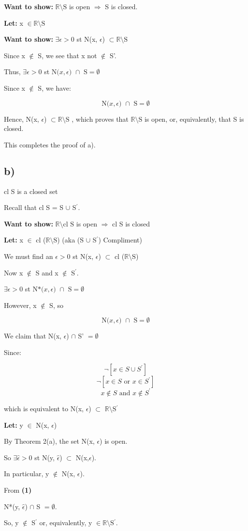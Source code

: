 \documentclass{article}
\newcommand\ssc[2][\DefaultOpt]{%
  \def\DefaultOpt{#2}%
  \subsection[#1]{#2}%
}
\newcommand{\lt}[1]{\textbf{Let: } #1}
\newcommand{\wts}[1]{\textbf{Want to show: } #1}
\newcommand{\bpth}[1]{\textbf{(#1)}}
\newcommand{\step}[2]{\begin{equation}\tag{#2}#1\end{equation}}
\newcommand{\br}{\mathbb{R}}       %
\newcommand{\ep}{\epsilon}         %
\newcommand{\sbs}{\subset}         %
\newcommand{\rar}{\Rightarrow}     %
\newcommand{\pr}{^\prime} 		   %
\newcommand{\butnot}[2]{#1\setminus{\textrm{#2}}}
\newcommand{\nbhe}[3]{\textrm{N(}#1, #2\textrm{) }\cap \textrm{ #3} = \emptyset}
\newcommand{\dnbhe}[3]{\textrm{N*(}#1, #2\textrm{) }\cap \textrm{ #3} = \emptyset}
\begin{document}
\wts{$\butnot{\br}{S}$ is open $\rar$ S is closed.} \

\lt{x $\in \butnot{\br}{S}$}


\wts{$\exists \ep > 0$ st N(x, $\ep$) $\sbs \butnot{\br}{S}$}

Since x $\not\in$ S, we see that x not $\not\in$ S'.

Thus, $\exists \ep > 0$ st $\nbhe{x}{\epsilon}{S}$ \

Since x $\not\in$ S, we have:

\step{\nbhe{x}{\epsilon}{S}}{1}

Hence, N(x, $\ep$) $\sbs \butnot{\br}{S}$ , which proves that $\butnot{\br}{S}$ is open, or, equivalently, that S is closed. \

This completes the proof of a).

\ssc{b)}
cl S is a closed set \

Recall that cl S = S $\cup$ S$\pr$.

\wts{$\butnot{\br}{cl S}$ is open $\rar$ cl S is closed}

\lt{x $\in$ cl ($\butnot{\br}{S}$) (aka (S $\cup$ S$\pr$) Compliment)} \

We must find an $\ep > 0$ st N(x, $\ep$) $\subset$ cl ($\butnot{\br}{S}$) \

Now x $\not\in$ S and x $\not\in$ S$\pr$. \

$\exists \ep > 0$ st $\dnbhe{x}{\epsilon}{S}$ \

However, x $\not\in$ S, so \

\step{\nbhe{x}{\epsilon}{S}}{1}

We claim that N(x, $\ep$) $\cap$ S' $= \emptyset$ \

Since:

\[\neg [x \in S \cup S\pr]\]
\[\neg [x \in S \textrm{ or }x \in S\pr]\]
\[x \not\in S \textrm{ and }x \not\in S\pr\]

which is equivalent to N(x, $\ep$) $\sbs$ $\butnot{\br}{S$\pr$}$ \

\lt{y $\in$ N(x, $\ep$)}

By Theorem 2(a), the set N(x, $\ep$) is open. \

So $\exists \hat{\epsilon} > 0$ st N(y, $\hat{\epsilon}$) $\subset$ N(x,$\ep$). \

In particular, y $\not\in$ N(x, $\ep$). \

From \bpth{1} \

N*(y, $\hat{\epsilon}$) $\cap$ S $= \emptyset$. \

So, y $\not\in$ S$\pr$ or, equivalently, y $\in \butnot{\br}{S$\pr$}$.
\end{document}
